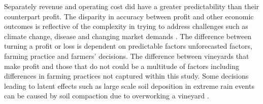 \documentclass[review,12pt,authoryear]{elsarticle}
\begin{document}
\begin{linenumbers}







Separately revenue and operating cost did have a greater predictability than their counterpart profit. The disparity in accuracy between profit and other economic outcomes is reflective of the complexity in trying to address challenges such as climate change, disease and changing market demands \citep{wineaustraliaNationalVintageReport2020,wineaustraliaNationalVintageReport2021,wineaustraliaNationalVintageReport2022}. The difference between turning a profit or loss is dependent on predictable factors unforecasted factors, farming practice and farmers' decisions. The difference between vineyards that make profit and those that do not could be a multitude of factors including differences in farming practices not captured within this study. Some decisions leading to latent effects such as large scale soil deposition in extreme rain events can be caused by soil compaction due to overworking a vineyard \citep{capelloPermanentCoverSoil2020}. 

\iffalse



\end{linenumbers}
\end{document}
